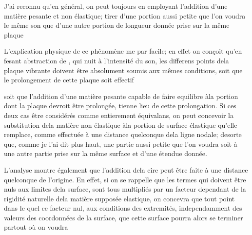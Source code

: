 \documentclass[11pt,a4paper]{article}
\begin{document}
J'ai reconnu qu'en général, on peut toujours en employant
l'addition d'une matière pesante et non élastique; tirer
d'une portion 
 aussi petite
que l'on voudra  le même son que d'une autre
portion de longueur donnée prise sur la même plaque

L'explication physique de ce phénomène me par
facile; en effet on conçoit qu'en fesant abstraction de
, qui  nuit à l'intensité
du son, les differens points dela plaque vibrante
doivent être absolument soumis aux mêmes conditions,
soit que le prolongement de cette plaque soit effectif


soit que l'addition d'une matière pesante  capable
de faire equilibre àla portion dont la plaque devroit
être prolongée, tienne lieu de cette  prolongation.
Si ces deux cas   être considérés comme entierement
équivalans, on peut concevoir la substitution dela
matière  non élastique àla portion de surface
élastique qu'elle remplace,  comme effectuée à une
distance quelconque dela ligne nodale; desorte que, comme
je l'ai dit plus haut, une partie aussi petite
que l'on voudra soit  à une autre
partie prise sur la même  surface et d'une
étendue donnée.


L'analyse montre également que l'addition dela cire
peut être faite à une distance quelconque de
l'origine. En effet, si on se rappelle que les
termes qui doivent être nuls  aux limites
dela surface, sont tous  multipliés par un facteur
dependant de la rigidité naturelle dela matière
supposée elastique, on concevra que tout point dans
le quel ce facteur   nul,  aux conditions
des extremités, independamment des valeurs des coordonnées
de la surface,   
que cette surface pourra alors se terminer partout où on voudra
\end{document}
